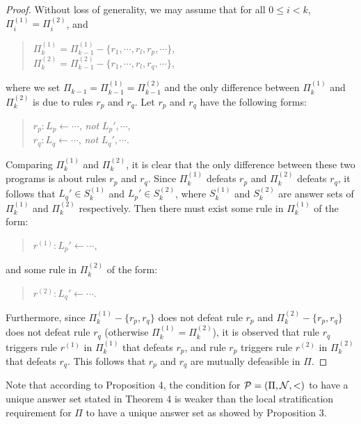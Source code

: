 \documentclass{tlp}
\begin{document}
\begin{proof}
Without loss of generality, we may assume that 
for all
$0\leq i < k$, $\Pi_{i}^{(1)}=\Pi_{i}^{(2)}$, and
\begin{quote}
$\Pi_{k}^{(1)}=\Pi_{k-1}^{(1)} - \{r_{1},\cdots, r_{l}, r_{p},\cdots\}$,\\
\hspace*{.1in} $\Pi_{k}^{(2)}=\Pi_{k-1}^{(2)} - \{r_{1},\cdots, r_{l}, r_{q},\cdots\}$,
\end{quote}
where we set $\Pi_{k-1}=\Pi_{k-1}^{(1)}=\Pi_{k-1}^{(2)}$ and the only difference
between $\Pi_{k}^{(1)}$ and $\Pi_{k}^{(2)}$ is due to rules $r_{p}$ and $r_{q}$.
Let $r_{p}$ and $r_{q}$ have the following forms:
\begin{quote}
$r_{p}: L_{p}\leftarrow\cdots$, {\em not} $L_{p}', \cdots$,\\
\hspace*{.1in} $r_{q}: L_{q}\leftarrow\cdots$, {\em not} $L_{q}', \cdots$.
\end{quote}
Comparing $\Pi_{k}^{(1)}$ and $\Pi_{k}^{(2)}$, it is clear that the only difference
between these two programs is about rules $r_{p}$ and $r_{q}$.  Since
$\Pi_{k}^{(1)}$ defeats $r_{p}$ and $\Pi_{k}^{(2)}$ defeats $r_{q}$, it follows that
$L_{q}'\in S_{k}^{(1)}$ and $L_{p}'\in S_{k}^{(2)}$, where
$S_{k}^{(1)}$ and $S_{k}^{(2)}$ are answer sets of
$\Pi_{k}^{(1)}$ and $\Pi_{k}^{(2)}$ respectively.
%
Then there must exist some rule in $\Pi_{k}^{(1)}$ of the form:
\begin{quote}
$r^{(1)}: L_{p}'\leftarrow\cdots$,
\end{quote}
and some rule in $\Pi_{k}^{(2)}$ of the form:
\begin{quote}
$r^{(2)}: L_{q}'\leftarrow\cdots$.
\end{quote}
Furthermore, since $\Pi_{k}^{(1)}-\{r_{p}, r_{q}\}$
does not defeat rule $r_{p}$ and $\Pi_{k}^{(2)}-\{r_{p}, r_{q}\}$
does not defeat rule $r_{q}$ (otherwise
$\Pi_{k}^{(1)}=\Pi_{k}^{(2)}$), it is observed that
rule $r_{q}$ triggers rule $r^{(1)}$ in $\Pi_{k}^{(1)}$
that defeats $r_{p}$, and rule $r_{p}$
triggers rule $r^{(2)}$ in $\Pi_{k}^{(2)}$
that defeats $r_{q}$. This follows that $r_{p}$ and
$r_{q}$ are mutually defeasible in $\Pi$.
\end{proof}


Note that according to Proposition 4, the condition 
for ${\cal P}=(\Pi,{\cal N},<)$ to have a unique answer set 
stated in Theorem 4 is weaker than the  
local stratification requirement for $\Pi$ to have
a unique answer set as showed by Proposition 3.
\end{document}
